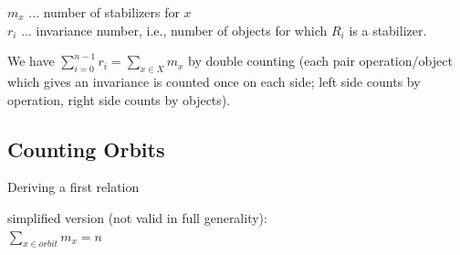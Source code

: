 \documentclass[12pt,onecolumn%
]{scrartcl}
\begin{document}
$m_{x}$ ... number of stabilizers for $x$ \\
$r_{i}$ ... invariance number, i.e., number of objects for which
$R_{i}$ is a stabilizer.

We have $\sum \limits_{i = 0}^{n - 1} r_{i} = \sum \limits_{x \in X} m_{x}$
by double counting (each pair operation/object which gives
an invariance is counted once on each side; left side counts
by operation, right side counts by objects).

\subsection{Counting Orbits}
Deriving a first relation { simplified version (not valid in full
generality):\\
$ \sum \limits_{x \in orbit} m_{x} = n $

}
\end{document}
